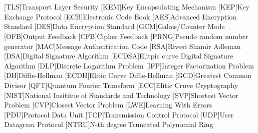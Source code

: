 \cleardoublepage
\chapter*{\listofabbrevname}
{}

\begin{acronym}[mmmmmmm]
	[TLS]{Transport Layer Security}
	[KEM]{Key Encapsulating Mechanism}
  [KEP]{Key Exchange Protocol}
	[ECB]{Electronic Code Book}
	[AES]{Advanced Encryption Standard}
	[DES]{Data Encryption Standard}
	[GCM]{Galois/Counter Mode}
	[OFB]{Output Feedback}
	[CFB]{Cipher Feedback}
	[PRNG]{Pseudo random number generator}
	[MAC]{Message Authentication Code}
	[RSA]{Rivest Shamir Adleman}
	[DSA]{Digital Signature Algorithm}
	[ECDSA]{Elitpic curve Digital Signature Algorithm}
	[DLP]{Discrete Logarithm Problem}
	[IFP]{Integer Factorization Problem}
	[DH]{Diffie-Hellman}
	[ECDH]{Elitic Curve Diffie-Hellman}
	[GCD]{Greatest Common Divisor}
	[QFT]{Quantum Fourier Transform}
	[ECC]{Elitic Cruve Cryptography}
	[NIST]{National Insititue of Standards and Technology}
	[SVP]{Shortest Vector Problem}
	[CVP]{Closest Vector Problem}
	[LWE]{Learning With Errors}
  [PDU]{Protocol Data Unit}
  [TCP]{Transmission Control Protocol}
  [UDP]{User Datagram Protocol}
	[NTRU]{N-th degree Truncated Polynomial Ring}
\end{acronym}
